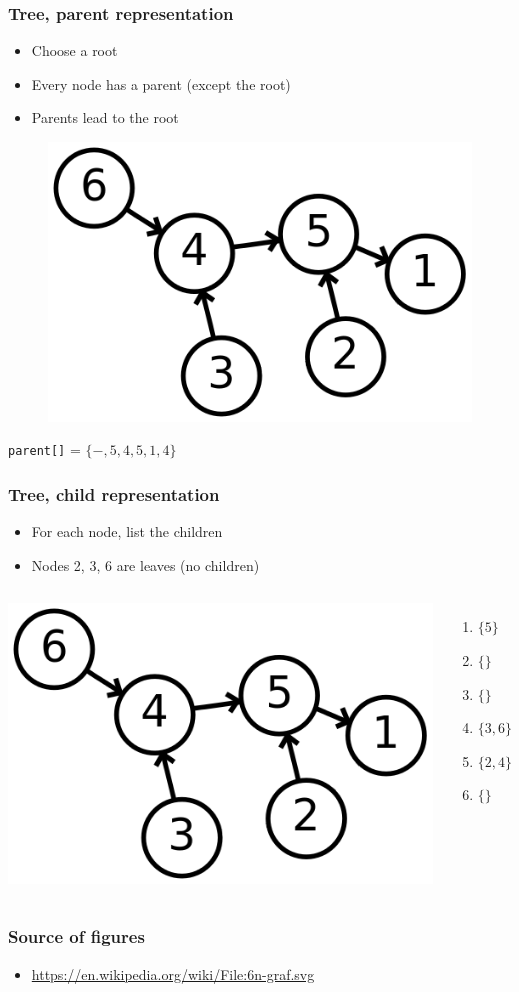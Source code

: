 \documentclass[12pt]{beamer}
\begin{document}
\begin{frame}
\frametitle{Tree, parent representation}
\begin{itemize}
\item Choose a root
\item Every node has a parent (except the root)
\item Parents lead to the root
\end{itemize}
\begin{figure}
\centering
\includegraphics[width=.5\linewidth]{img/6n-tree-parent}
\end{figure}
\begin{center}
\texttt{parent[]} = $\{-,5,4,5,1,4\}$
\end{center}
\end{frame}

\begin{frame}
\frametitle{Tree, child representation}
\begin{itemize}
\item For each node, list the children
\item Nodes 2, 3, 6 are leaves (no children)
\end{itemize}
\begin{columns}
\flushright
\includegraphics[width=0.75\linewidth]{img/6n-tree-parent}
\begin{enumerate}
\item $\{5\}$
\item $\{\}$
\item $\{\}$
\item $\{3,6\}$
\item $\{2,4\}$
\item $\{\}$
\end{enumerate}
\end{columns}
\end{frame}

\begin{frame}
\frametitle{Source of figures}
\begin{itemize}
\item \url{https://en.wikipedia.org/wiki/File:6n-graf.svg}
\end{itemize}
\end{frame}
\end{document}
